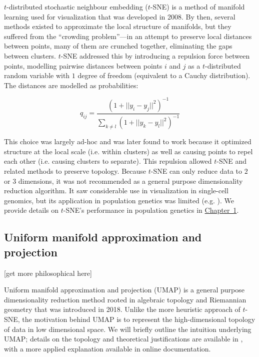 $t$-distributed stochastic neighbour embedding ($t$-SNE) is a method of manifold learning used for visualization that was developed in 2008\citep{maaten_visualizing_2008}. By then, several methods existed to approximate the local structure of manifolds, but they suffered from the ``crowding problem''---in an attempt to preserve local distances between points, many of them are crunched together, eliminating the gaps between clusters. $t$-SNE addressed this by introducing a repulsion force between points, modelling pairwise distances between points $i$ and $j$ as a $t$-distributed random variable with $1$ degree of freedom (equivalent to a Cauchy distribution). The distances are modelled as probabilities:

$$q_{ij} = \frac{(1 + ||y_{i} - y_{j}||^{2})^{-1}}{\sum_{k \neq l}(1 + ||y_{k} - y_{l}||^{2})^{-1}}$$

This choice was largely ad-hoc and was later found to work because it optimized structure at the local scale (i.e. within clusters) as well as causing points to repel each other (i.e. causing clusters to separate)\citep{carreira-perpinan_elastic_2010}. This repulsion allowed $t$-SNE and related methods to preserve topology\citep{wasserman_topological_2018}. Because $t$-SNE can only reduce data to $2$ or $3$ dimensions, it was not recommended as a general purpose dimensionality reduction algorithm\citep{maaten_visualizing_2008}. It saw considerable use in visualization in single-cell genomics\citep{kobak_art_2019}, but its application in population genetics was limited (e.g. \citep{li_application_2017}). We provide details on $t$-SNE's performance in population genetics in \hyperref[chap:chapter1]{Chapter~1}.

\subsection{Uniform manifold approximation and projection}

[get more philosophical here]

Uniform manifold approximation and projection (UMAP) is a general purpose dimensionality reduction method rooted in algebraic topology and Riemannian geometry that was introduced in 2018\citep{mcinnes_umap_2020}. Unlike the more heuristic approach of $t$-SNE, the motivation behind UMAP is to represent the high-dimensional topology of data in low dimensional space. We will briefly outline the intuition underlying UMAP; details on the topology and theoretical justifications are available in \citep{mcinnes_umap_2020}, with a more applied explanation available in online documentation\citep{mcinnes_umapdoc_2018}.

